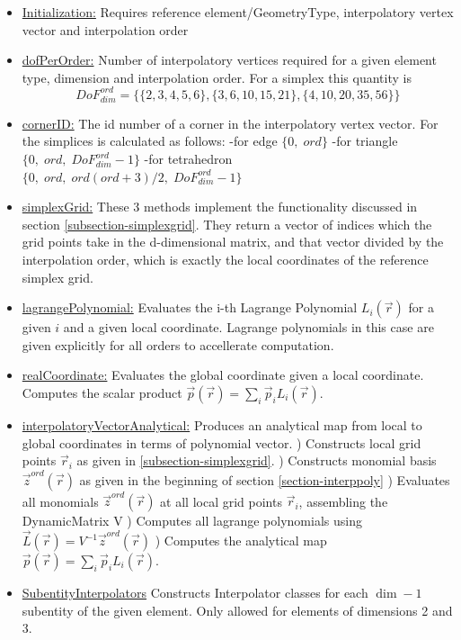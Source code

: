 \documentclass[12pt]{article}
\begin{document}
\begin{itemize}
	\item \uline{Initialization:} Requires reference element/GeometryType, interpolatory vertex vector and interpolation order
	\item \uline{dofPerOrder:} Number of interpolatory vertices required for a given element type, dimension and interpolation order. For a simplex this quantity is
	\[ {DoF}_{dim}^{ord} = \{ \{ 2,3,4,5,6 \}, \{ 3,6,10,15,21 \}, \{ 4,10,20,35,56 \} \} \]
	\item \uline{cornerID:} The id number of a corner in the interpolatory vertex vector. For the simplices is calculated as follows:
		\subitem -for edge $\{ 0, \; ord \}$
		\subitem -for triangle $\{0, \; ord, \; {DoF}_{dim}^{ord} - 1\}$
		\subitem -for tetrahedron $\{0, \; ord, \; ord (ord + 3) / 2, \; {DoF}_{dim}^{ord} - 1\}$
	\item \uline{simplexGrid:} These 3 methods implement the functionality discussed in section \ref{subsection-simplexgrid}. They return a vector of indices which the grid points take in the d-dimensional matrix, and that vector divided by the interpolation order, which is exactly the local coordinates of the reference simplex grid.
	\item \uline{lagrangePolynomial:} Evaluates the i-th Lagrange Polynomial $L_i(\vec{r})$ for a given $i$ and a given local coordinate. Lagrange polynomials in this case are given explicitly for all orders to accellerate computation.
	\item \uline{realCoordinate:} Evaluates the global coordinate given a local coordinate. Computes the scalar product $\vec{p}(\vec{r}) = \sum_i \vec{p}_i L_i (\vec{r})$.
	\item \uline{interpolatoryVectorAnalytical:} Produces an analytical map from local to global coordinates in terms of polynomial vector.
		) Constructs local grid points $\vec{r}_i$ as given in \ref{subsection-simplexgrid}.		
		) Constructs monomial basis $\vec{z}^{ord}(\vec{r})$ as given in the beginning of section \ref{section-interppoly}
		) Evaluates all monomials $\vec{z}^{ord}(\vec{r})$ at all local grid points $\vec{r}_i$, assembling the DynamicMatrix V
		) Computes all lagrange polynomials using $\vec{L}(\vec{r}) = V^{-1} \vec{z}^{ord}(\vec{r})$
		) Computes the analytical map $\vec{p}(\vec{r}) = \sum_i \vec{p}_i L_i (\vec{r})$.
	\item \uline{SubentityInterpolators} Constructs Interpolator classes for each $\dim - 1$ subentity of the given element. Only allowed for elements of dimensions 2 and 3.

\end{itemize}
\end{document}
